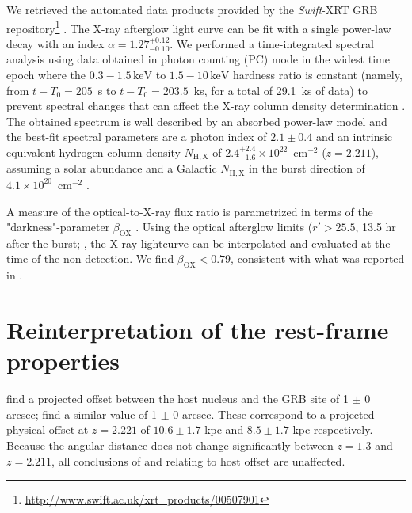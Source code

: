 \documentclass{aa}    %
\begin{document}
We retrieved the automated data products provided by the \textit{Swift}-XRT GRB
repository\footnote{\url{http://www.swift.ac.uk/xrt\_products/00507901}}
\citep{Evans2009}. 
The X-ray afterglow light curve can be fit with a single power-law decay with an
index $\alpha=1.27_{-0.10}^{+0.12}$. We performed a time-integrated spectral
analysis using data obtained in photon counting (PC) mode in the widest time epoch where
the $0.3-1.5\,\mathrm{keV}$ to $1.5-10\,\mathrm{keV}$ hardness ratio is constant
(namely, from $t-T_0 = 205$~s to $t-T_0 = 203.5$~ks, for a total of 29.1~ks of
data) to prevent spectral changes that can affect the X-ray column density
determination \citep{Kopac2012}. 
The obtained spectrum is well described by an absorbed power-law
model and the best-fit spectral parameters are a photon index of $2.1 \pm 0.4$ and
an intrinsic equivalent hydrogen column density $N_{\mathrm{H,X}}$ of $2.4_{-1.6}^{+2.4}
\times 10^{22}$~cm$^{-2}$ ($z=2.211$), assuming a solar abundance and a Galactic $N_{\mathrm{H,X}}$ in
the burst direction of $4.1 \times 10^{20}$~cm$^{-2}$ \citep{Willingale2013}.

A measure of the optical-to-X-ray flux ratio is parametrized in terms of the
"darkness"-parameter $\beta_\mathrm{OX} $ \citep{Jakobsson2004}. Using the optical
afterglow limits ($r' > 25.5$, 13.5 hr after the burst; \citealt{Cucchiara2011,
	Cenko2011}, the X-ray lightcurve can be interpolated and evaluated at the time
of the non-detection. We find $\beta_\mathrm{OX} < 0.79$, consistent with what was
reported in \citet{Sakamoto2013}.

\section{Reinterpretation of the rest-frame properties}

\citet{Margutti2012} find a projected offset between the host nucleus and the
GRB site of 1 $\pm$ 0 arcsec; \citet{Sakamoto2013}
find a similar value of 1 $\pm$ 0 arcsec. These correspond
to a projected physical offset at $z = 2.221$ of $10.6 \pm 1.7$ kpc and $8.5 \pm
1.7$ kpc respectively. Because the angular distance does not change
significantly between $z = 1.3$ and $z = 2.211$, all conclusions of
\citet{Margutti2012} and \citet{Sakamoto2013} relating to host offset are
unaffected.

\end{document}
